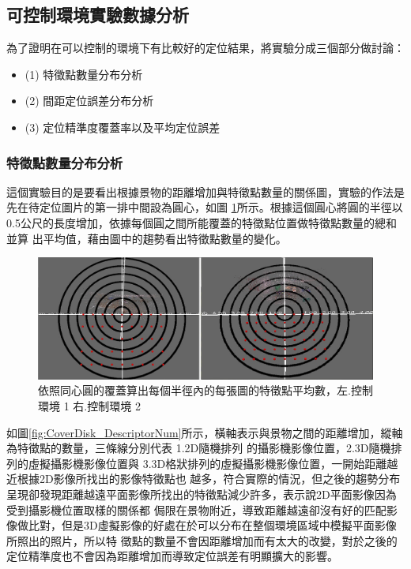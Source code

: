 

\subsection{可控制環境實驗數據分析}

	為了證明在可以控制的環境下有比較好的定位結果，將實驗分成三個部分做討論：
	
\begin{itemize}
  \item (1) 特徵點數量分布分析
  \item (2) 間距定位誤差分布分析
  \item (3) 定位精準度覆蓋率以及平均定位誤差
\end{itemize}
		
\subsubsection{特徵點數量分布分析}

	這個實驗目的是要看出根據景物的距離增加與特徵點數量的關係圖，實驗的作法是先在待定位圖片的第一排中間設為圓心，如圖
\ref{fig:CoverDisk}所示。根據這個圓心將圓的半徑以 0.5公尺的長度增加，依據每個圓之間所能覆蓋的特徵點位置做特徵點數量的總和並算
出平均值，藉由圖中的趨勢看出特徵點數量的變化。

\begin{figure}
\begin{center}
  \includegraphics[width=1.0\textwidth]{figures/CoverDisk.jpg}
  \caption{依照同心圓的覆蓋算出每個半徑內的每張圖的特徵點平均數，左.控制環境 1 右.控制環境 2}
  \label{fig:CoverDisk}
\end{center}
\end{figure}
	
	如圖\ref{fig:CoverDisk_DescriptorNum}所示，橫軸表示與景物之間的距離增加，縱軸為特徵點的數量，三條線分別代表 1.2D隨機排列
的攝影機影像位置，2.3D隨機排列的虛擬攝影機影像位置與 3.3D格狀排列的虛擬攝影機影像位置，一開始距離越近根據2D影像所找出的影像特徵點也
越多，符合實際的情況，但之後的趨勢分布呈現卻發現距離越遠平面影像所找出的特徵點減少許多，表示說2D平面影像因為受到攝影機位置取樣的關係都
侷限在景物附近，導致距離越遠卻沒有好的匹配影像做比對，但是3D虛擬影像的好處在於可以分布在整個環境區域中模擬平面影像所照出的照片，所以特
徵點的數量不會因距離增加而有太大的改變，對於之後的定位精準度也不會因為距離增加而導致定位誤差有明顯擴大的影響。
			

